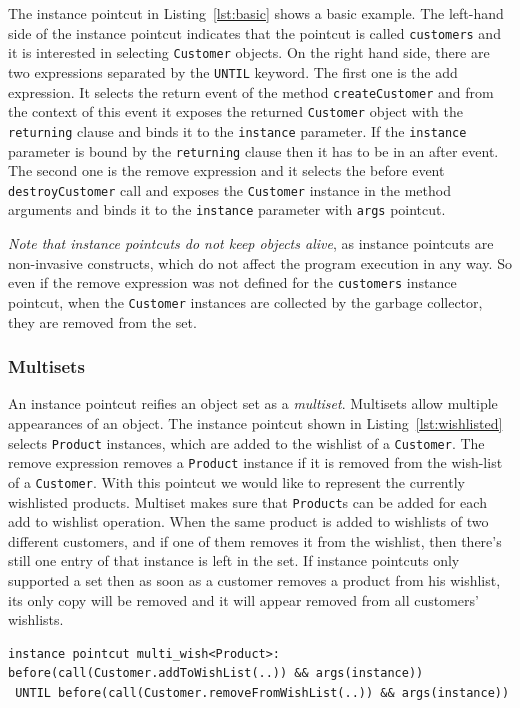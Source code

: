 \documentclass{llncs}
\begin{document}
The instance pointcut in Listing~\ref{lst:basic} shows a basic example. The left-hand side of the instance pointcut indicates that the pointcut is called \texttt{customers} and it is interested in selecting \texttt{Customer} objects. 
On the right hand side, there are two expressions separated by the \texttt{UNTIL} keyword. The first one is the add expression. It selects the return event of the method \texttt{createCustomer} and from the context of this event it exposes the returned \texttt{Customer} object with the \texttt{returning} clause and binds it to the \texttt{instance} parameter. If the \texttt{instance} parameter is bound by the \texttt{returning} clause then it has to be in an after event. The second one is the remove expression and it selects the before event \texttt{destroyCustomer} call and exposes the \texttt{Customer} instance in the method arguments and binds it to the \texttt{instance} parameter with \texttt{args} pointcut.


\emph{Note that instance pointcuts do not keep objects alive}, as instance pointcuts are non-invasive constructs, which do not affect the program execution in any way. So even if the remove expression was not defined for the \texttt{customers} instance pointcut, when the \texttt{Customer} instances are collected by the garbage collector, they are removed from the set. 


\subsubsection{Multisets}
An instance pointcut reifies an object set as a \emph{multiset}. Multisets allow multiple appearances of an object. The instance pointcut shown in Listing~\ref{lst:wishlisted} selects \texttt{Product} instances, which are added to the wishlist of a \texttt{Customer}. The remove expression removes a \texttt{Product} instance if it is removed from the wish-list of a \texttt{Customer}. With this pointcut we would like to represent the currently wishlisted products. Multiset makes sure that \texttt{Product}s can be added for each add to wishlist operation. When the same product is added to wishlists of two different customers, and if one of them removes it from the wishlist, then there's still one entry of that instance is left in the set.  If instance pointcuts only supported a set then as soon as a customer removes a product from his wishlist, its only copy will be removed and it will appear removed from all customers' wishlists.

\begin{lstlisting}[float=h!, caption={An instance pointcut utilizing multiset property}, label={lst:wishlisted}]
instance pointcut multi_wish<Product>: 
before(call(Customer.addToWishList(..)) && args(instance))
 UNTIL before(call(Customer.removeFromWishList(..)) && args(instance))
\end{lstlisting}
\end{document}
